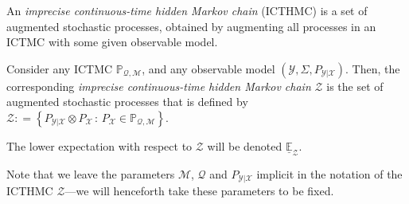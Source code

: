 \documentclass[twoside,11pt]{article}
\newcommand{\reals}{\mathbb{R}}
\newcommand{\states}{\mathcal{X}}
\newcommand{\observs}{\mathcal{Y}}
\newcommand{\lexp}{\underline{\mathbb{E}}_{\rateset,\mathcal{M}}}
\newcommand{\gambles}{\mathcal{L}}
\newcommand{\ind}[1]{\mathbb{I}_{#1}}
\newcommand{\rateset}{\mathcal{Q}}
\newcommand{\coloneqq}{:\!=}
\begin{document}
An \emph{imprecise continuous-time hidden Markov chain} (ICTHMC) is a set of augmented stochastic processes, obtained by augmenting all processes in an ICTMC with some given observable model.
\begin{definition}[ICTHMC]\label{def:hidden_ictmc}
Consider any ICTMC $\mathbb{P}_{\rateset,\mathcal{M}}$, and any observable model $(\observs,\Sigma,P_{\observs\vert\states})$. Then, the corresponding \emph{imprecise continuous-time hidden Markov chain} $\mathcal{Z}$ is the set of augmented stochastic processes that is defined by
$\mathcal{Z} \coloneqq \left\{ P_{\observs\vert\states}\otimes P_{\states} \,:\, P_{\states}\in\mathbb{P}_{\rateset,\mathcal{M}}\right\}$.

The lower expectation with respect to $\mathcal{Z}$ will be denoted $\underline{\mathbb{E}}_\mathcal{Z}$.
\end{definition}
Note that we leave the parameters $\mathcal{M}$, $\rateset$ and $P_{\observs\vert\states}$ implicit in the notation of the ICTHMC $\mathcal{Z}$---we will henceforth take these parameters to be fixed.



\end{document}
